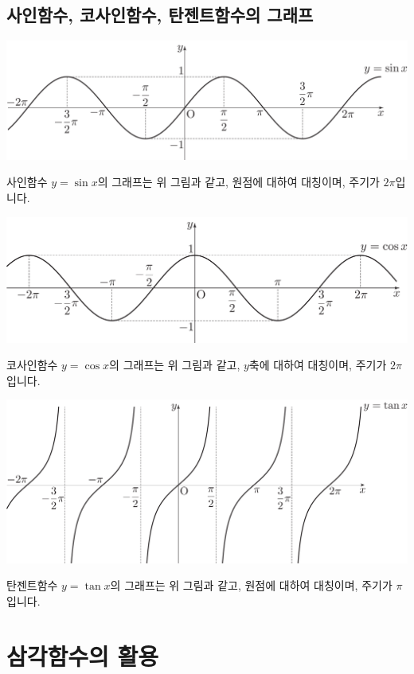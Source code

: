 \subsection{사인함수, 코사인함수, 탄젠트함수의 그래프}
\begin{center}
\includegraphics[scale=0.125]{pic0/pic156.pdf}
\end{center}사인함수 $y=\sin x$의 그래프는 위 그림과 같고, 원점에 대하여 대칭이며, 주기가 $2\pi$입니다.
\begin{center}
\includegraphics[scale=0.125]{pic0/pic157.pdf}
\end{center}코사인함수 $y=\cos x$의 그래프는 위 그림과 같고, $y$축에 대하여 대칭이며, 주기가 $2\pi$입니다.
\begin{center}
\includegraphics[scale=0.125]{pic0/pic158.pdf}
\end{center}탄젠트함수 $y=\tan x$의 그래프는 위 그림과 같고, 원점에 대하여 대칭이며, 주기가 $\pi$입니다.
\clearpage
\section{삼각함수의 활용}
